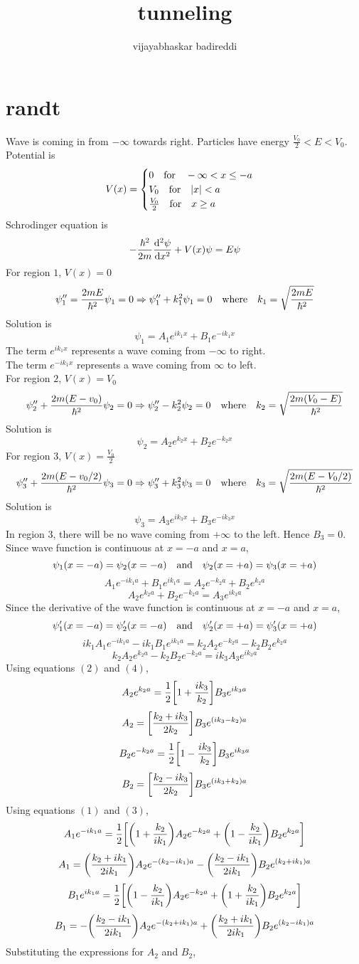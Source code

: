 \documentclass[12pt]{article}
\title{tunneling}
\author{vijayabhaskar badireddi}
\begin{document}
\section*{randt}
Wave is coming in from $-\infty$ towards right. Particles have energy $\frac{V_0}{2}<E<V_0$.\\
Potential is 
$$
V(x)=
\begin{cases}
0 \qq{for} -\infty < x \le -a \\
V_0 \qq{for} |x|<a\\
\frac{V_0}{2} \qq{for} x\ge a
\end{cases}
$$
Schrodinger equation is
\[-\frac{\hbar^2}{2m}\dv[2]{\psi}{x}+V(x)\psi=E\psi\]
For region $1$, $V(x)=0$\\
\[\psi_1''=\frac{2mE}{\hbar^2}\psi_1=0\Rightarrow\psi_1''+k_1^2\psi_1=0\qq{where}k_1=\sqrt{\frac{2mE}{\hbar^2}}\]
Solution is 
\[\psi_1=A_1e^{ik_1x}+B_1e^{-ik_1x}\]
The term $e^{ik_1x}$ represents a wave coming from $-\infty$ to right.\\
The term $e^{-ik_1x}$ represents a wave coming from $\infty$ to left.\\
For region $2$, $V(x)=V_0$\\
\[\psi_2''+\frac{2m(E-v_0)}{\hbar^2}\psi_2=0\Rightarrow\psi_2''-k_2^2\psi_2=0\qq{where}k_2=\sqrt{\frac{2m(V_0-E)}{\hbar^2}}\]
Solution is 
\[\psi_2=A_2e^{k_2x}+B_2e^{-k_2x}\]
For region $3$, $V(x)=\frac{V_0}{2}$\\
\[\psi_3''+\frac{2m(E-v_0/2)}{\hbar^2}\psi_3=0\Rightarrow\psi_3''+k_3^2\psi_3=0\qq{where}k_3=\sqrt{\frac{2m(E-V_0/2)}{\hbar^2}}\]
Solution is 
\[\psi_3=A_3e^{ik_3x}+B_3e^{-ik_3x}\]
In region $3$, there will be no wave coming from $+\infty$ to the left. Hence $B_3=0$.\\
Since wave function is continuous at $x=-a$ and $x=a$,
\[\psi_1(x=-a)=\psi_2(x=-a)\qq{and}\psi_2(x=+a)=\psi_3(x=+a)\]
\[A_1e^{-ik_1a}+B_1e^{ik_1a}=A_2e^{-k_2a}+B_2e^{k_2a}\tag{1}\]
\[A_2e^{k_2a}+B_2e^{-k_2a}=A_3e^{ik_3a}\tag{2}\]
Since the derivative of the wave function is continuous at $x=-a$ and $x=a$,
\[\psi_1'(x=-a)=\psi_2'(x=-a)\qq{and}\psi_2'(x=+a)=\psi_3'(x=+a)\]
\[ik_1A_1e^{-ik_1a}-ik_1B_1e^{ik_1a}=k_2A_2e^{-k_2a}-k_2B_2e^{k_2a}\tag{3}\]
\[k_2A_2e^{k_2a}-k_2B_2e^{-k_2a}=ik_3A_3e^{ik_3a}\tag{4}\]
Using equations $(2)$ and $(4)$,
\[A_2e^{k_2a}=\frac{1}{2}\qty[1+\frac{ik_3}{k_2}]B_3e^{ik_3a}\]
\[A_2=\qty[\frac{k_2+ik_3}{2k_2}]B_3e^{(ik_3-k_2)a}\]
\[B_2e^{-k_2a}=\frac{1}{2}\qty[1-\frac{ik_3}{k_2}]B_3e^{ik_3a}\]
\[B_2=\qty[\frac{k_2-ik_3}{2k_2}]B_3e^{(ik_3+k_2)a}\]
\newpage
Using equations $(1)$ and $(3)$,
\[A_1e^{-ik_1a}=\frac{1}{2}\qty[\qty(1+\frac{k_2}{ik_1})A_2e^{-k_2a}+\qty(1-\frac{k_2}{ik_1})B_2e^{k_2a}]\]
\[A_1=\qty(\frac{k_2+ik_1}{2ik_1})A_2e^{-(k_2-ik_1)a}-\qty(\frac{k_2-ik_1}{2ik_1})B_2e^{(k_2+ik_1)a}\]
\[B_1e^{ik_1a}=\frac{1}{2}\qty[\qty(1-\frac{k_2}{ik_1})A_2e^{-k_2a}+\qty(1+\frac{k_2}{ik_1})B_2e^{k_2a}]\]
\[B_1=-\qty(\frac{k_2-ik_1}{2ik_1})A_2e^{-(k_2+ik_1)a}+\qty(\frac{k_2+ik_1}{2ik_1})B_2e^{(k_2-ik_1)a}\]
Substituting the expressions for $A_2$ and $B_2$,
\end{document}
